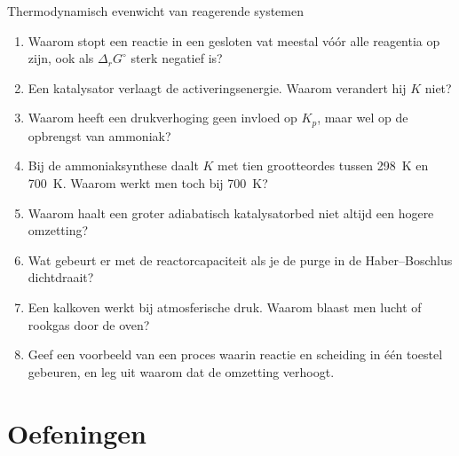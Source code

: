 \begin{reflectie}{Thermodynamisch evenwicht van reagerende systemen}
\begin{enumerate}
\item Waarom stopt een reactie in een gesloten vat meestal v\'o\'or alle reagentia op zijn, ook als $\Delta_rG^\circ$ sterk negatief is?
\item Een katalysator verlaagt de activeringsenergie. Waarom verandert hij $K$ niet?
\item Waarom heeft een drukverhoging geen invloed op $K_p$, maar wel op de opbrengst van ammoniak?
\item Bij de ammoniaksynthese daalt $K$ met tien grootteordes tussen \SI{298}{\kelvin} en \SI{700}{\kelvin}. Waarom werkt men toch bij \SI{700}{\kelvin}?
\item Waarom haalt een groter adiabatisch katalysatorbed niet altijd een hogere omzetting?
\item Wat gebeurt er met de reactorcapaciteit als je de purge in de Haber--Boschlus dichtdraait?
\item Een kalkoven werkt bij atmosferische druk. Waarom blaast men lucht of rookgas door de oven?
\item Geef een voorbeeld van een proces waarin reactie en scheiding in \'e\'en toestel gebeuren, en leg uit waarom dat de omzetting verhoogt.
\end{enumerate}
\end{reflectie}

\newpage
\section{Oefeningen}



